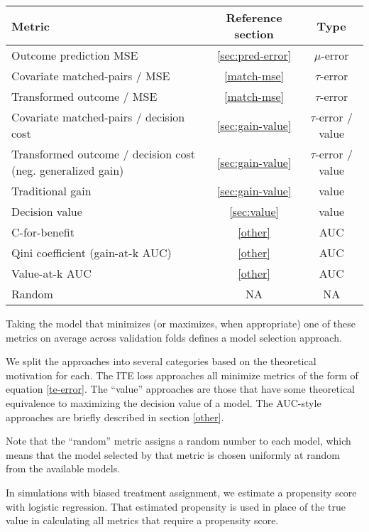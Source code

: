 \begin{center}
\begin{tabu}{|m{6cm}|c|c|}
	\hline
	 \rowfont[c]{\bfseries} Metric & Reference section & Type \\
	 \hline
	 Outcome prediction MSE &  \ref{sec:pred-error} & $\mu$-error \\
	 \hline
	 Covariate matched-pairs / MSE & \ref{match-mse} & $\tau$-error \\
	 Transformed outcome / MSE & \ref{match-mse} & $\tau$-error \\
	 Covariate matched-pairs / decision cost &  \ref{sec:gain-value} & $\tau$-error / value \\
	 Transformed outcome / decision cost (neg. generalized gain) & \ref{sec:gain-value} & $\tau$-error / value \\
	 \hline
	 Traditional gain &  \ref{sec:gain-value} & value \\ 
	 Decision value &  \ref{sec:value} & value \\
	 \hline
	 C-for-benefit &  \ref{other} & AUC \\
	 Qini coefficient (gain-at-k AUC) &  \ref{other} & AUC \\
	 Value-at-k AUC &  \ref{other} & AUC \\
	 \hline
	 Random & NA &  NA \\
	 \hline
\end{tabu}
\end{center}

Taking the model that minimizes (or maximizes, when appropriate) one of these metrics on average across validation folds defines a model selection approach. 

We split the approaches into several categories based on the theoretical motivation for each. The ITE loss approaches all minimize metrics of the form of equation \ref{te-error}. The ``value'' approaches are those that have some theoretical equivalence to maximizing the decision value of a model. The AUC-style approaches are briefly described in section \ref{other}. 

Note that the ``random'' metric assigns a random number to each model, which means that the model selected by that metric is chosen uniformly at random from the available models. 

In simulations with biased treatment assignment, we estimate a propensity score with logistic regression. That estimated propensity is used in place of the true value in calculating all metrics that require a propensity score.

